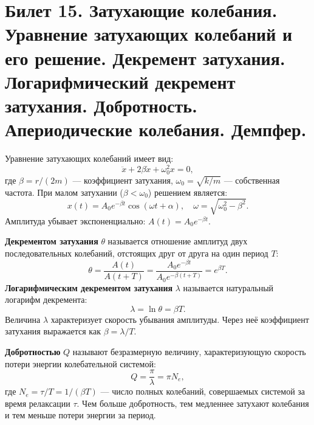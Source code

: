 \section{Билет 15. Затухающие колебания. Уравнение затухающих колебаний и его решение. Декремент затухания. Логарифмический декремент затухания. Добротность. Апериодические колебания. Демпфер.}

\begin{definition}
Уравнение затухающих колебаний имеет вид:
\begin{equation}
    \ddot{x} + 2\beta \dot{x} + \omega_0^2 x = 0, \label{eq:damped_15}
\end{equation}
где $\beta = r/(2m)$ --- коэффициент затухания, $\omega_0 = \sqrt{k/m}$ --- собственная частота. При малом затухании ($\beta < \omega_0$) решением является:
\begin{equation}
    x(t) = A_0 e^{-\beta t} \cos(\omega t + \alpha), \quad \omega = \sqrt{\omega_0^2 - \beta^2}.
\end{equation}
Амплитуда убывает экспоненциально: $A(t) = A_0 e^{-\beta t}$.
\end{definition}

\begin{definition}
\textbf{Декрементом затухания} $\theta$ называется отношение амплитуд двух последовательных колебаний, отстоящих друг от друга на один период $T$:
\begin{equation}
    \theta = \frac{A(t)}{A(t+T)} = \frac{A_0 e^{-\beta t}}{A_0 e^{-\beta (t+T)}} = e^{\beta T}.
\end{equation}
\textbf{Логарифмическим декрементом затухания} $\lambda$ называется натуральный логарифм декремента:
\begin{equation}
    \lambda = \ln \theta = \beta T. \label{eq:log_decrement}
\end{equation}
Величина $\lambda$ характеризует скорость убывания амплитуды. Через неё коэффициент затухания выражается как $\beta = \lambda / T$.
\end{definition}

\begin{property}
\textbf{Добротностью} $Q$ называют безразмерную величину, характеризующую скорость потери энергии колебательной системой:
\begin{equation}
    Q = \frac{\pi}{\lambda} = \pi N_e, \label{eq:quality_factor}
\end{equation}
где $N_e = \tau/T = 1/(\beta T)$ --- число полных колебаний, совершаемых системой за время релаксации $\tau$. Чем больше добротность, тем медленнее затухают колебания и тем меньше потери энергии за период.
\end{property}


